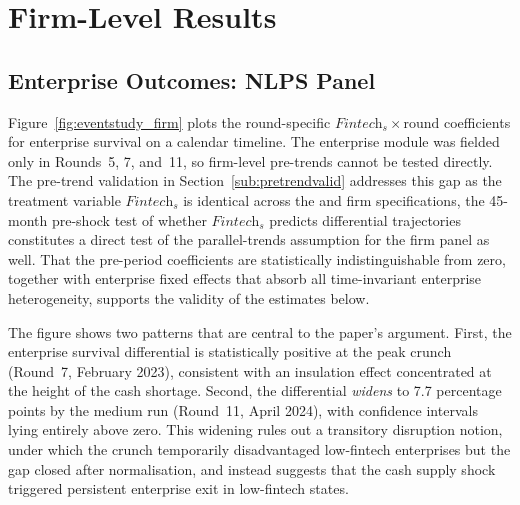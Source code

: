 
\section{Firm-Level Results}
\label{sec:results_micro}

\subsection{Enterprise Outcomes: NLPS Panel}
\label{sub:nlps_results}

Figure~\ref{fig:eventstudy_firm} plots the round-specific
$\textit{Fintech}_s \times \text{round}$ coefficients for enterprise survival
on a calendar timeline. The enterprise module was fielded only in Rounds~5, 7,
and~11, so firm-level pre-trends cannot be tested directly. The \NTL{}
pre-trend validation in Section~\ref{sub:pretrendvalid} addresses this gap as
 the treatment variable $\textit{Fintech}_s$ is identical across the
\NTL{} and firm specifications, the 45-month pre-shock test of whether
$\textit{Fintech}_s$ predicts differential \NTL{} trajectories constitutes a
direct test of the parallel-trends assumption for the firm panel as well.
That the pre-period coefficients are statistically
indistinguishable from zero, together with enterprise fixed effects that absorb
all time-invariant enterprise heterogeneity, supports the validity of the
estimates below.

The figure shows two patterns that are central to the paper's argument. First,
the enterprise survival differential is statistically positive at the peak
crunch (Round~7, February 2023), consistent with an insulation effect
concentrated at the height of the cash shortage. Second, the differential
\emph{widens} to 7.7 percentage points by the medium run (Round~11,
April 2024), with confidence intervals lying entirely above zero. This
widening rules out a transitory disruption notion, under which the crunch
temporarily disadvantaged low-fintech enterprises but the gap closed after
normalisation, and instead suggests that the cash supply shock triggered
persistent enterprise exit in low-fintech states.

